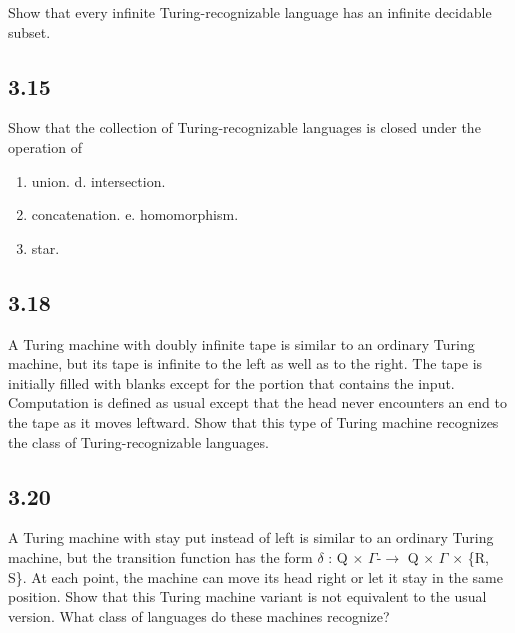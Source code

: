 Show that every infinite Turing-recognizable language has an infinite decidable subset.


\subsection*{3.15}

Show that the collection of Turing-recognizable languages is closed under the operation of

\begin{enumerate}[label=(\alph*), leftmargin=2.5em]

\item union. d. intersection.

\item concatenation. e. homomorphism.

\item star.

\end{enumerate}


\subsection*{3.18}

A Turing machine with doubly infinite tape is similar to an ordinary Turing machine, but its tape is infinite to the left as well as to the right. The tape is initially filled with blanks except for the portion that contains the input. Computation is defined as usual except that the head never encounters an end to the tape as it moves leftward. Show that this type of Turing machine recognizes the class of Turing-recognizable languages.


\subsection*{3.20}

A Turing machine with stay put instead of left is similar to an ordinary Turing machine, but the transition function has the form $\delta$ : Q $\times$ $\Gamma$-$\to$ Q $\times$ $\Gamma$ $\times$ \{R, S\}. At each point, the machine can move its head right or let it stay in the same position. Show that this Turing machine variant is not equivalent to the usual version. What class of languages do these machines recognize?


\clearpage
